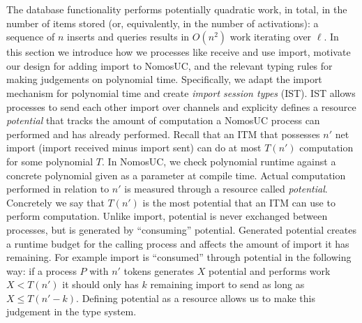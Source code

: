 The database functionality performs potentially quadratic work, in total, in the number of items stored (or, equivalently, in the number of activations): a sequence of $n$ inserts and queries results in $O(n^2)$ work iterating over $\ell$.
In this section we introduce how we processes like \Fdb receive and use import, motivate our design for adding import to NomosUC, and the relevant typing rules for making judgements on polynomial time.
Specifically, we adapt the import mechanism for polynomial time and create \emph{import session types} (IST).
IST allows processes to send each other import over channels and explicity defines a resource \emph{potential} that tracks the amount of computation a NomosUC process can performed and has already performed. 
Recall that an ITM that possesses $n'$ net import (import received minus import sent) can do at most $T(n')$ computation for some polynomial $T$.
In NomosUC, we check polynomial runtime against a concrete polynomial given as a parameter at compile time. 
Actual computation performed in relation to $n'$ is measured through a resource called \emph{potential}.
Concretely we say that $T(n')$ is the most potential that an ITM can use to perform computation. 
Unlike import, potential is never exchanged between processes, but is generated by ``consuming'' potential.
Generated potential creates a runtime budget for the calling process and affects the amount of import it has remaining. 
For example import is ``consumed'' through potential in the following way: if a process $P$ with $n'$ tokens generates $X$ potential and performs work $X < T(n')$ it should only has $k$ remaining import to send as long as $X \leq T(n'-k)$.
Defining potential as a resource allows us to make this judgement in the type system. 


